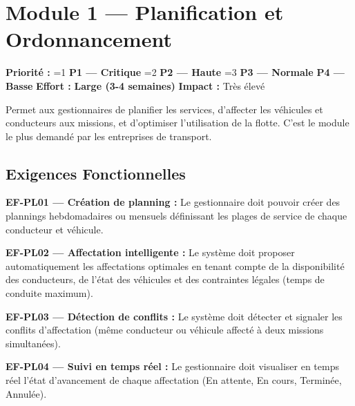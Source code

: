 \documentclass[12pt,a4paper]{report}
\newcommand{\prio}[1]{%
  \ifnum#1=1 \textcolor{fleeterror}{\textbf{P1 — Critique}}%
  \else\ifnum#1=2 \textcolor{fleetwarning}{\textbf{P2 — Haute}}%
  \else\ifnum#1=3 \textcolor{fleetsuccess}{\textbf{P3 — Normale}}%
  \else \textcolor{fleetgray}{\textbf{P4 — Basse}}%
  \fi\fi\fi}
\newcommand{\effort}[1]{\textcolor{fleetpurple}{\textbf{#1}}}
\begin{document}
\chapter{Module 1 — Planification et Ordonnancement}

\begin{tcolorbox}[colback=fleetblue!5, colframe=fleetblue, title={\bfseries Résumé du Module}, fonttitle=\color{white}]
\textbf{Priorité :} \prio{1} \quad \textbf{Effort :} \effort{Large (3-4 semaines)} \quad \textbf{Impact :} Très élevé

Permet aux gestionnaires de planifier les services, d'affecter les véhicules et conducteurs aux missions, et d'optimiser l'utilisation de la flotte. C'est le module le plus demandé par les entreprises de transport.
\end{tcolorbox}

\section{Exigences Fonctionnelles}

\begin{reqbox}
\textbf{EF-PL01 — Création de planning :} Le gestionnaire doit pouvoir créer des plannings hebdomadaires ou mensuels définissant les plages de service de chaque conducteur et véhicule.
\end{reqbox}

\begin{reqbox}
\textbf{EF-PL02 — Affectation intelligente :} Le système doit proposer automatiquement les affectations optimales en tenant compte de la disponibilité des conducteurs, de l'état des véhicules et des contraintes légales (temps de conduite maximum).
\end{reqbox}

\begin{reqbox}
\textbf{EF-PL03 — Détection de conflits :} Le système doit détecter et signaler les conflits d'affectation (même conducteur ou véhicule affecté à deux missions simultanées).
\end{reqbox}

\begin{reqbox}
\textbf{EF-PL04 — Suivi en temps réel :} Le gestionnaire doit visualiser en temps réel l'état d'avancement de chaque affectation (En attente, En cours, Terminée, Annulée).
\end{reqbox}
\end{document}

